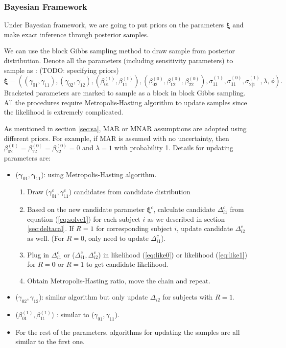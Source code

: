 \documentclass[12pt]{article}
\begin{document}
\subsubsection{Bayesian Framework}
\label{sec:bayesian}
Under Bayesian framework, we are going to put priors on the parameters
$\bm \xi$ and make exact inference through posterior samples.

We can use the block Gibbs sampling method to draw sample from
posterior distribution. Denote all the parameters (including
sensitivity parameters) to sample as : (TODO: specifying priors)
\begin{displaymath}
  \bm \xi = \left( (\gamma_{01}, \gamma_{11}),
    (\gamma_{02}, \gamma_{12}), (\beta_{01}^{(1)}, \beta_{11}^{(1)}),
    (\beta_{02}^{(0)}, \beta_{12}^{(0)}, \beta_{22}^{(0)}),
    \sigma_{11}^{(1)}, \sigma_{11}^{(0)}, \sigma_{2|1}^{(1)}, \lambda,
    \phi \right).
\end{displaymath}
Bracketed parameters are marked to sample as a block in block Gibbs
sampling.  All the procedures require Metropolis-Hasting algorithm to
update samples since the likelihood is extremely complicated.

As mentioned in section \ref{sec:sa}, MAR or MNAR assumptions are
adopted using different priors. For example, if MAR is assumed with no
uncertainty, then $\beta_{02}^{(0)} = \beta_{12}^{(0)} =
\beta_{22}^{(0)} = 0$ and $\lambda = 1$ with probability 1. Details
for updating parameters are:

\begin{itemize}
\item ($\bm \gamma_{01}, \bm \gamma_{11}$): using Metropolis-Hasting
  algorithm.
  \begin{enumerate}
  \item Draw ($\gamma_{01}^c, \gamma_{11}^c$) candidates from
    candidate distribution
  \item Based on the new candidate parameter $\bm \xi^c$, calculate
    candidate $\Delta_{i1}^c$ from equation (\ref{eq:solve1}) for each
    subject $i$ as we described in section \ref{sec:deltacal}. If $R =
    1$ for corresponding subject $i$, update candidate $\Delta_{i2}^c$
    as well. (For $R = 0$, only need to update $\Delta_{i1}^c$).
  \item Plug in $\Delta_{i1}^c$ or ($\Delta_{i1}^c, \Delta_{i2}^c$) in
    likelihood (\ref{eq:like0}) or likelihood (\ref{eq:like1}) for $R
    = 0$ or $R = 1$ to get candidate likelihood.
  \item Obtain Metropolis-Hasting ratio, move the chain and repeat.
  \end{enumerate}
\item ($\gamma_{02}, \gamma_{12}$): similar algorithm but only update
  $\Delta_{i2}$ for subjects with $R = 1$.
\item ($\beta_{01}^{(1)}, \beta_{11}^{(1)}$) : similar to
  ($\gamma_{01}, \gamma_{11}$).
\item For the rest of the parameters, algorithms for updating the
  samples are all similar to the first one.
\end{itemize}
\end{document}
